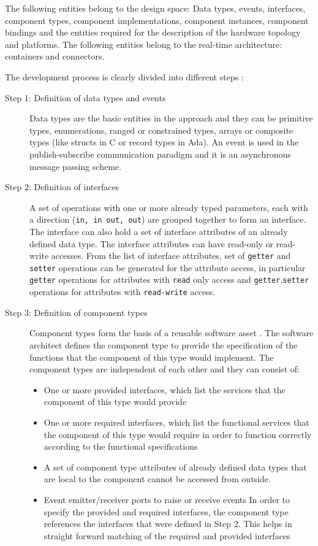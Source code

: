 The following entities belong to the design space: Data types, events, interfaces, component types, component implementations, component instances, component bindings and the entities required for the description of the hardware topology and platforms. The following entities belong to the real-time architecture: containers and connectors.

The development process is clearly divided into different steps \cite{CompBasedProcess, PhdThesis,SAVOIR}:

\begin{description}
\item [Step 1: Definition of data types and events] Data types are the basic entities in the approach and they can be primitive types, enumerations, ranged or constrained types, arrays or composite types (like structs in C or record types in Ada). An event is used in the publish-subscribe communication paradigm and it is an asynchronous message passing scheme.

\item [Step 2: Definition of interfaces] A set of operations with one or more already typed parameters, each with a direction (\texttt{in, in out, out}) are grouped together to form an interface. The interface can also hold a set of interface attributes of an already defined data type. The interface attributes can have read-only or read-write accesses. From the list of interface attributes, set of \texttt{getter} and \texttt{setter} operations can be generated for the attribute access, in particular \texttt{getter} operations for attributes with \texttt{read} only access and \texttt{getter},\texttt{setter} operations for attributes with \texttt{read-write} access. 

\item [Step 3: Definition of component types] Component types form the basis of a reusable software asset \cite{CompBasedProcess}. The software architect defines the component type to provide the specification of the functions that the component of this type would implement. The component types are independent of each other and they can consist of:
\begin{itemize}
\item One or more provided interfaces, which list the services that the component of this type would provide
\item One or more required interfaces, which list the functional services that the component of this type would require in order to function correctly according to the functional specifications
\item A set of component type attributes of already defined data types that are local to the component cannot be accessed from outside.
\item Event emitter/receiver ports to raise or receive events
In order to specify the provided and required interfaces, the component type references the interfaces that were defined in Step 2. This helps in straight forward matching of the required and provided interfaces  
\end{itemize}


\end{description}
